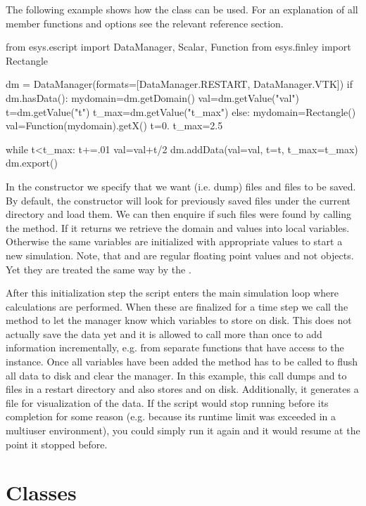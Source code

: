 The following example shows how the  class can be used.
For an explanation of all member functions and options see the relevant
reference section.
\begin{python}
  from esys.escript import DataManager, Scalar, Function
  from esys.finley import Rectangle

  dm = DataManager(formats=[DataManager.RESTART, DataManager.VTK])
  if dm.hasData():
    mydomain=dm.getDomain()
    val=dm.getValue("val")
    t=dm.getValue("t")
    t_max=dm.getValue("t_max")
  else:
    mydomain=Rectangle()
    val=Function(mydomain).getX()
    t=0.
    t_max=2.5

  while t<t_max:
    t+=.01
    val=val+t/2
    dm.addData(val=val, t=t, t_max=t_max)
    dm.export()
\end{python}
In the constructor we specify that we want  (i.e. dump) files
and  files to be saved.
By default, the constructor will look for previously saved 
files under the current directory and load them.
We can then enquire if such files were found by calling the 
method. If it returns \True we retrieve the domain and values into local
variables. Otherwise the same variables are initialized with appropriate
values to start a new simulation.
Note, that  and  are regular floating point values and not
\Data objects. Yet they are treated the same way by the .

After this initialization step the script enters the main simulation loop
where calculations are performed.
When these are finalized for a time step we call the  method
to let the manager know which variables to store on disk.
This does not actually save the data yet and it is allowed to call
 more than once to add information incrementally, e.g. from
separate functions that have access to the  instance.
Once all variables have been added the  method has to be called
to flush all data to disk and clear the manager.
In this example, this call dumps  and  to files
in a restart directory and also stores  and  on disk.
Additionally, it generates a \VTK file for visualization of the data.
If the script would stop running before its completion for some reason (e.g.
because its runtime limit was exceeded in a multiuser environment), you could
simply run it again and it would resume at the point it stopped before.

\section{\escript Classes}

